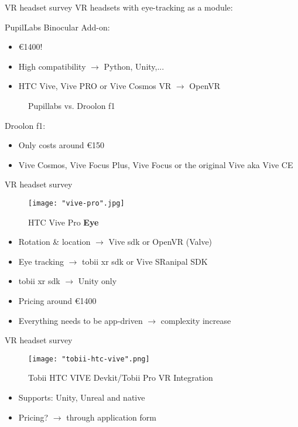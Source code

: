 \documentclass{beamer}
\begin{document}
\begin{frame}{VR headset survey}
	VR headsets with eye-tracking as a module:
	\vspace{0.5cm}
	
	PupilLabs Binocular Add-on:
	\begin{itemize}
		\item €1400!
		\item High compatibility $\rightarrow$ Python, Unity,...
		\item HTC Vive, Vive PRO or Vive Cosmos VR $\rightarrow$ OpenVR
	\end{itemize} 
	
	\begin{figure}
		\centering
		\qquad
		\caption{Pupillabs vs. Droolon f1}%
		\label{fig:example}%
	\end{figure}
	
	Droolon f1:
	\begin{itemize}
		\item Only costs around €150
		\item Vive Cosmos, Vive Focus Plus, Vive Focus or the original Vive aka Vive CE
	\end{itemize}
\end{frame}


\begin{frame}{VR headset survey}
	\begin{figure}
		\texttt{[image: "vive-pro".jpg]}
		\caption{HTC Vive Pro \textbf{Eye}}
	\end{figure}
	

	\begin{itemize}
		\item Rotation \& location $\rightarrow$ Vive sdk or OpenVR (Valve)
		\item Eye tracking $\rightarrow$ tobii xr sdk or Vive SRanipal SDK
		\item tobii xr sdk $\rightarrow$ Unity only
		\item Pricing around €1400
		\item Everything needs to be app-driven $\rightarrow$ complexity increase
	\end{itemize}
\end{frame}



\begin{frame}{VR headset survey}
	\begin{figure}
		\texttt{[image: "tobii-htc-vive".png]}
		\caption{Tobii HTC VIVE Devkit/Tobii Pro VR Integration}
	\end{figure}
	

	\begin{itemize}
		\item Supports: Unity, Unreal and native 
		\item Pricing? $\rightarrow$ through application form
	\end{itemize}
\end{frame}
\end{document}
